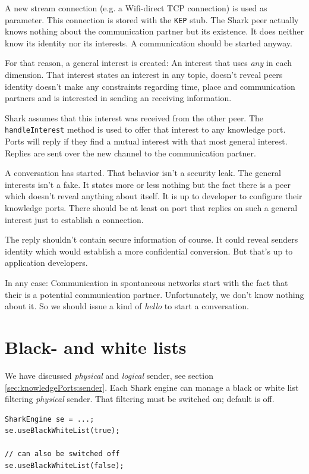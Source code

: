 A new stream connection (e.g. a Wifi-direct TCP connection) is used as parameter. This connection is stored with the {\tt KEP} stub. The Shark peer actually knows nothing about the communication partner but its existence. It does neither know its identity nor its interests. A communication should be started anyway.

For that reason, a general interest is created: An interest that uses {\it any} in each dimension. That interest states an interest in any topic, doesn't reveal peers identity doesn't make any constraints regarding time, place and communication partners and is interested in sending an receiving information.

Shark assumes that this interest was received from the other peer. The {\tt handleInterest} method is used to offer that interest to any knowledge port. Ports will reply if they find a mutual interest with that most general interest. Replies are sent over the new channel to the communication partner.

A conversation has started. That behavior isn't a security leak. The general interests isn't a fake. It states more or less nothing but the fact there is a peer which doesn't reveal anything about itself. It is up to developer to configure their knowledge ports. There should be at least on port that replies on such a general interest just to establish a connection.

The reply shouldn't contain secure information of course. It could reveal senders identity which would establish a more confidential conversion. 
But that's up to application developers.

In any case: Communication in spontaneous networks start with the fact that their is a potential communication partner. Unfortunately, we don't know nothing about it. So we should issue a kind of {\it hello} to start a conversation.

\section{Black- and white lists}
We have discussed {\it physical} and {\it logical} sender, see section \ref{sec:knowledgePorts:sender}. Each Shark engine can manage a black or white list filtering {\it physical} sender. That filtering must be switched on; default is off.

\begin{verbatim}
SharkEngine se = ...;
se.useBlackWhiteList(true);

// can also be switched off
se.useBlackWhiteList(false);
\end{verbatim}

